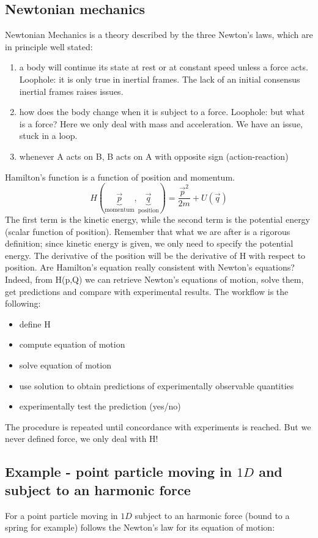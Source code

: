   \subsection{Newtonian mechanics}
  Newtonian Mechanics is a theory described by the three Newton's laws, which are in principle well stated:
  \begin{enumerate}
    \item a body will continue its state at rest or at constant speed unless a force acts. Loophole: it is only true in inertial frames. The lack of an initial consensus inertial frames raises issues.
    \item how does the body change when it is subject to a force. Loophole: but what is a force? Here we only deal with mass and acceleration. We have an issue, stuck in a loop.
    \item whenever A acts on B, B acts on A with opposite sign (action-reaction)
  \end{enumerate}
  
  Hamilton's function is a function of position and momentum. 
  $$H(\underbrace{\vec{p}}_{\text{momentum}}, \underbrace{\vec{q}}_{\text{position}}) = \frac{\vec{p}^2}{2m} + U(\vec{q})$$
  The first term is the kinetic energy, while the second term is the potential energy (scalar function of position). Remember that what we are after is   a rigorous definition; since kinetic energy is given, we only need to specify the potential energy. The derivative of the position will be the derivative of H with respect to position.
Are Hamilton's equation really consistent with Newton's equations? Indeed, from H(p,Q) we can retrieve Newton's equations of motion, solve them, get predictions and compare with experimental results. The workflow is the following:
\begin{itemize}
    \item define H
    \item compute equation of motion
    \item solve equation of motion
    \item use solution to obtain predictions of experimentally observable quantities
    \item experimentally test the prediction (yes/no)
\end{itemize}
The procedure is repeated until concordance with experiments is reached. But we never defined force, we only deal with H!

  \subsection{Example - point particle moving in $1D$ and subject to an harmonic force}
  For a point particle moving in $1D$ subject to an harmonic force (bound to a spring for example) follows the Newton's law for its equation of motion:

